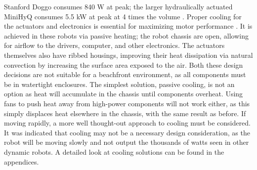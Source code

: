 Stanford Doggo consumes 840 W at peak; the larger hydraulically actuated MiniHyQ consumes 5.5 kW at peak at 4 times the volume \cite{kau_nate711/stanforddoggoproject_2019} \cite{khan_minihyq_2015}.
Proper cooling for the actuators and electronics is essential for maximizing motor performance \cite{csanyi_optimize_2017}. It is achieved in these robots via passive heating; the robot chassis are open, allowing for airflow to the drivers, computer, and other electronics.
The actuators themselves also have ribbed housings, improving their heat dissipation via natural convection by increasing the surface area exposed to the air.
Both these design decisions are not suitable for a beachfront environment, as all components must be in watertight enclosures.
The simplest solution, passive cooling, is not an option as heat will accumulate in the chassis until components overheat.
Using fans to push heat away from high-power components will not work either, as this simply displaces heat elsewhere in the chassis, with the same result as before.
If moving rapidly, a more well thought-out approach to cooling must be considered.
It was indicated that cooling may not be a necessary design consideration, as the robot will be moving slowly and not output the thousands of watts seen in other dynamic robots.
A detailed look at cooling solutions can be found in the appendices.